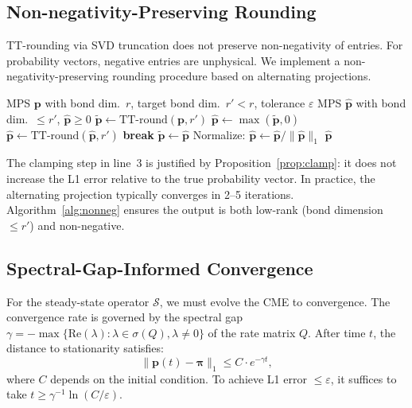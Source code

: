 \documentclass[11pt]{article}
\newcommand{\norm}[1]{\lVert #1 \rVert}
\newcommand{\eps}{\varepsilon}
\begin{document}
\subsection{Non-negativity-Preserving Rounding}\label{sec:algorithms:nonneg}

TT-rounding via SVD truncation does not preserve non-negativity of entries.
For probability vectors, negative entries are unphysical.
We implement a non-negativity-preserving rounding procedure based on
alternating projections.

\begin{algorithm}[t]
\caption{Non-negativity-preserving TT rounding}
\label{alg:nonneg}
\begin{algorithmic}[1]
\REQUIRE MPS $\mathbf{p}$ with bond dim.\ $r$, target bond dim.\ $r'<r$,
         tolerance $\eps$
\ENSURE MPS $\hat{\mathbf{p}}$ with bond dim.\ $\leq r'$,
        $\hat{\mathbf{p}} \geq 0$
\STATE $\tilde{\mathbf{p}} \leftarrow \text{TT-round}(\mathbf{p}, r')$
  \hfill{}
  \STATE $\hat{\mathbf{p}} \leftarrow \max(\tilde{\mathbf{p}}, 0)$
    \hfill{}
  \STATE $\hat{\mathbf{p}} \leftarrow \text{TT-round}(\hat{\mathbf{p}}, r')$
    \hfill{}
  \IF{$\norm{\hat{\mathbf{p}} - \tilde{\mathbf{p}}}_2 < \eps$}
    \STATE \textbf{break}
  \ENDIF
  \STATE $\tilde{\mathbf{p}} \leftarrow \hat{\mathbf{p}}$
\ENDFOR
\STATE Normalize: $\hat{\mathbf{p}} \leftarrow \hat{\mathbf{p}} / \norm{\hat{\mathbf{p}}}_1$
\RETURN $\hat{\mathbf{p}}$
\end{algorithmic}
\end{algorithm}

The clamping step in line~3 is justified by Proposition~\ref{prop:clamp}:
it does not increase the L1 error relative to the true probability
vector.
In practice, the alternating projection typically converges in
2--5 iterations.
Algorithm~\ref{alg:nonneg} ensures the output is both low-rank
(bond dimension $\leq r'$) and non-negative.

\subsection{Spectral-Gap-Informed Convergence}\label{sec:algorithms:spectral}

For the steady-state operator $\mathcal{S}$, we must evolve the
CME to convergence.
The convergence rate is governed by the spectral gap
$\gamma = -\max\{\mathrm{Re}(\lambda) : \lambda \in \sigma(Q), \lambda \neq 0\}$
of the rate matrix $Q$.
After time $t$, the distance to stationarity satisfies:
\begin{equation}\label{eq:spectral-convergence}
  \norm{\mathbf{p}(t) - \boldsymbol{\pi}}_1
  \leq C \cdot e^{-\gamma t},
\end{equation}
where $C$ depends on the initial condition.
To achieve L1 error $\leq \eps$, it suffices to take
$t \geq \gamma^{-1}\ln(C/\eps)$.
\end{document}
